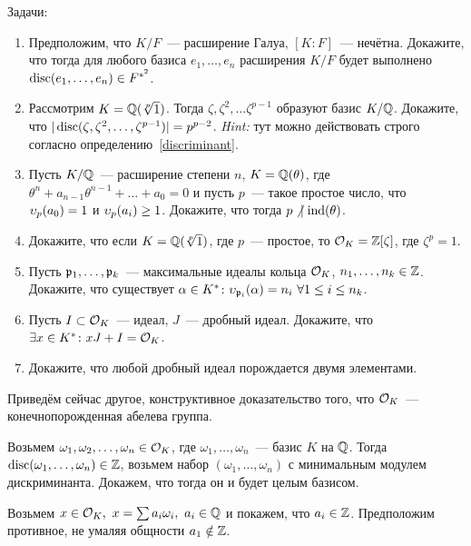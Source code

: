 		\begin{homework}\label{hw_4}
			Задачи:
			\begin{enumerate}
				\item Предположим, что $K/F$~--- расширение Галуа, $[K : F]$~--- нечётна. Докажите, что тогда 
				для любого базиса $e_1, \ldots, e_n$ расширения $K/F$ будет выполнено $\operatorname{disc}(e_1, \ldots, e_n) \in F^{*^{2}}$.

				\item Рассмотрим $K = \mathbb{Q}(\sqrt[p]{1})$. Тогда $\zeta, \zeta^2, \ldots \zeta^{p - 1}$ образуют базис $K/\mathbb{Q}$. Докажите, что $|\operatorname{disc}(\zeta, \zeta^2, \ldots, \zeta^{p - 1})| = p^{p - 2}$.
				\emph{Hint:} тут можно действовать строго согласно определению~\ref{discriminant}.

				\item Пусть $K/\mathbb{Q}$~--- расширение степени $n$, $K = \mathbb{Q}(\theta)$, где $\theta^n + a_{n - 1}\theta^{n - 1} + \ldots + a_0 = 0$ и пусть $p$~--- такое простое число, что $\upsilon_{p}(a_0) = 1$ и $\upsilon_{p}(a_i) \ge 1$. Докажите, что тогда $p \not \ \mid \operatorname{ind}(\theta)$.

				\item Докажите, что если $K = \mathbb{Q}(\sqrt[p]{1})$, где $p$~--- простое, то $\mathcal{O}_{K} = \mathbb{Z}[\zeta]$, где $\zeta^p = 1$.

				\item Пусть $\mathfrak{p}_{1}, \ldots, \mathfrak{p}_{k}$~--- максимальные идеалы кольца $\mathcal{O}_{K}$, $n_{1}, \ldots, n_{k} \in \mathbb{Z}$. Докажите, что существует $\alpha \in K^{*}\colon \upsilon_{\mathfrak{p}_{i}}(\alpha) = n_{i} \ \forall 1 \le i \le n_{k}$.

				\item Пусть $I \subset \mathcal{O}_{K}$~--- идеал, $J$~--- дробный идеал. Докажите, что $\exists x \in K^{*}\colon x J + I = \mathcal{O}_{K}$.

				\item Докажите, что любой дробный идеал порождается двумя элементами. 
			\end{enumerate}

			Приведём сейчас другое, конструктивное доказательство того, что $\mathcal{O}_{K}$~--- конечнопорожденная абелева группа. 

			Возьмем $\omega_{1}, \omega_{2}, \ldots, \omega_{n} \in \mathcal{O}_{K}$, где $\omega_{1}, \ldots, \omega_{n}$~--- базис $K$ на $\mathbb{Q}$.
			Тогда $\operatorname{disc}(\omega_{1}, \ldots, \omega_{n}) \in \mathbb{Z}$, возьмем набор $(\omega_1, \ldots, \omega_n)$ с минимальным модулем дискриминанта. Докажем, что тогда он и будет целым базисом. 

			Возьмем $x \in \mathcal{O}_{K}, \ x = \sum a_i \omega_i, \ a_i \in \mathbb{Q}$ и покажем, что $a_i \in \mathbb{Z}$. Предположим противное, не умаляя общности $a_{1} \notin \mathbb{Z}$. 



\end{homework}
